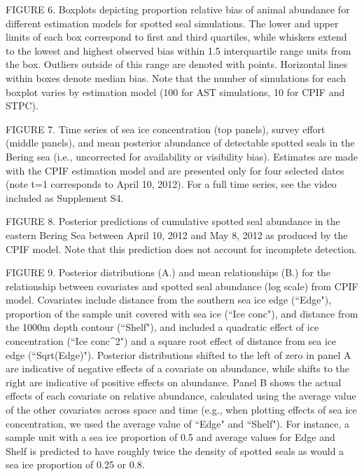 \documentclass[12pt,english]{article}
\begin{document}
\begin{spacing}{1.9}
FIGURE 6. Boxplots depicting proportion relative bias of animal abundance for different estimation models for spotted seal simulations.  The lower and upper limits of each box correspond to first and third quartiles, while whiskers extend to the lowest and highest observed bias within 1.5 interquartile range units from the box.  Outliers outside of this range are denoted with points.  Horizontal lines within boxes denote median bias.  Note that the number of simulations for each boxplot varies by estimation model (100 for AST simulations, 10 for CPIF and STPC).

FIGURE 7. Time series of sea ice concentration (top panels), survey effort (middle panels), and mean posterior abundance of detectable spotted seals in the Bering sea (i.e., uncorrected for availability or visibility bias).  Estimates are made with the CPIF estimation model and are presented only for four selected dates (note t=1 corresponds to April 10, 2012).  For a full time series, see the video included as Supplement S4.

FIGURE 8. Posterior predictions of cumulative spotted seal abundance in the eastern Bering Sea between April 10, 2012 and May 8, 2012 as produced by the CPIF model.  Note that this prediction does not account for incomplete detection.

FIGURE 9. Posterior distributions (A.) and mean relationships (B.) for the relationship between covariates and spotted seal abundance (log scale) from CPIF model.  Covariates include distance from the southern sea ice edge (``Edge"), proportion of the sample unit covered with sea ice (``Ice conc"), and distance from the 1000m depth contour (``Shelf"), and included a quadratic effect of ice concentration (``Ice conc\string^2") and a square root effect of distance from sea ice edge (``Sqrt(Edge)"). Posterior distributions shifted to the left of zero in panel A are indicative of negative effects of a covariate on abundance, while shifts to the right are indicative of positive effects on abundance.  Panel B shows the actual effects of each covariate on relative abundance, calculated using the average value of the other covariates across space and time (e.g., when plotting effects of sea ice concentration, we used the average value of ``Edge" and ``Shelf").  For instance, a sample unit with a sea ice proportion of 0.5 and average values for Edge and Shelf is predicted to have roughly twice the density of spotted seals as would a sea ice proportion of 0.25 or 0.8.


\end{spacing}
\end{document}
